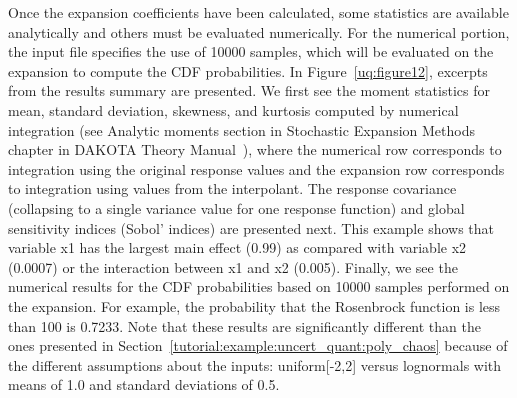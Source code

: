 Once the expansion coefficients have been calculated, some statistics
are available analytically and others must be evaluated numerically.
For the numerical portion, the input file specifies the use of 10000
samples, which will be evaluated on the expansion to compute the CDF
probabilities.  In Figure~\ref{uq:figure12}, excerpts from the results
summary are presented.  We first see the moment statistics for mean,
standard deviation, skewness, and kurtosis computed by numerical
integration (see Analytic moments section in Stochastic Expansion
Methods chapter in DAKOTA Theory Manual~\cite{TheoMan}), where the
numerical row corresponds to integration using the original response
values and the expansion row corresponds to integration using values
from the interpolant.  The response covariance (collapsing to a single
variance value for one response function) and global sensitivity
indices (Sobol' indices) are presented next. This example shows that
variable x1 has the largest main effect (0.99) as compared with
variable x2 (0.0007) or the interaction between x1 and x2 (0.005).
Finally, we see the numerical results for the CDF probabilities based
on 10000 samples performed on the expansion.  For example, the probability 
that the Rosenbrock function is less than 100 is 0.7233.  Note that these 
results are significantly different than the ones presented in 
Section~\ref{tutorial:example:uncert_quant:poly_chaos} because of 
the different assumptions about the inputs: uniform[-2,2] versus
lognormals with means of 1.0 and standard deviations of 0.5. 
